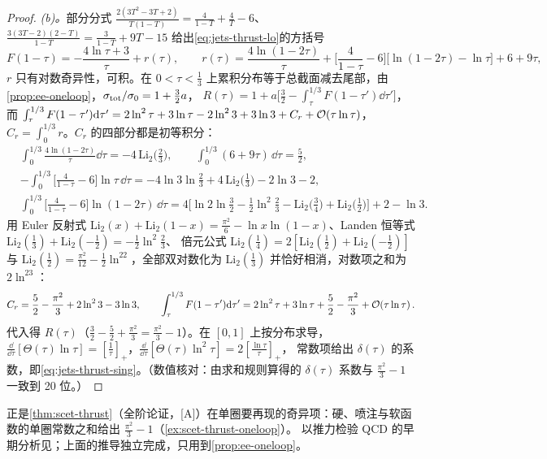 \begin{proof}
\emph{(b)。}部分分式 $\frac{2(3T^2-3T+2)}{T(1-T)}=\frac{4}{1-T}+\frac4T-6$、$\frac{3(3T-2)(2-T)}{1-T}=\frac{3}{1-T}+9T-15$ 给出\cref{eq:jets-thrust-lo}的方括号
\begin{equation}\label{eq:jets-F-split}
F(1-\tau)=-\frac{4\ln\tau+3}{\tau}+r(\tau),\qquad
r(\tau)=\frac{4\ln(1-2\tau)}{\tau}+\Big[\frac{4}{1-\tau}-6\Big]\big[\ln(1-2\tau)-\ln\tau\big]+6+9\tau ,
\end{equation}
$r$ 只有对数奇异性，可积。在 $0<\tau<\frac13$ 上累积分布等于总截面减去尾部，由\cref{prop:ee-oneloop}，$\sigma_{\rm tot}/\sigma_0=1+\frac32a$，
$R(\tau)=1+a\big[\frac32-\int_\tau^{1/3}F(1-\tau')\dd\tau'\big]$，而
$\int_\tau^{1/3}F(1-\tau')\mathrm{d}\tau'=2\ln^2\tau+3\ln\tau-2\ln^23+3\ln3+C_r+\mathcal{O}\!\left(\tau\ln\tau\right)$，$C_r=\int_0^{1/3}r$。$C_r$ 的四部分都是初等积分：
\[
\begin{aligned}
&\int_0^{1/3}\frac{4\ln(1-2\tau)}{\tau}\dd\tau=-4\,\mathrm{Li}_2\big(\tfrac23\big),\qquad \int_0^{1/3}(6+9\tau)\,\dd\tau=\tfrac52,\\
&-\int_0^{1/3}\Big[\frac{4}{1-\tau}-6\Big]\ln\tau\,\dd\tau=-4\ln3\ln\tfrac23+4\,\mathrm{Li}_2\big(\tfrac13\big)-2\ln3-2,\\
&\int_0^{1/3}\Big[\frac{4}{1-\tau}-6\Big]\ln(1-2\tau)\,\dd\tau=4\Big[\ln2\ln\tfrac32-\tfrac12\ln^2\tfrac23-\mathrm{Li}_2\big(\tfrac34\big)+\mathrm{Li}_2\big(\tfrac12\big)\Big]+2-\ln3 .
\end{aligned}
\]
用 Euler 反射式 $\mathrm{Li}_2(x)+\mathrm{Li}_2(1-x)=\frac{\pi^2}{6}-\ln x\ln(1-x)$、Landen 恒等式 $\mathrm{Li}_2(\frac13)+\mathrm{Li}_2(-\frac12)=-\frac12\ln^2\frac23$、
倍元公式 $\mathrm{Li}_2(\frac14)=2[\mathrm{Li}_2(\frac12)+\mathrm{Li}_2(-\frac12)]$ 与 $\mathrm{Li}_2(\frac12)=\frac{\pi^2}{12}-\frac12\ln^22$，全部双对数化为 $\mathrm{Li}_2(\frac13)$ 并恰好相消，对数项之和为 $2\ln^23$：
\begin{equation}\label{eq:jets-Cr}
C_r=\frac52-\frac{\pi^2}{3}+2\ln^23-3\ln3 ,\qquad
\int_\tau^{1/3}F(1-\tau')\mathrm{d}\tau'=2\ln^2\tau+3\ln\tau+\frac52-\frac{\pi^2}{3}+\mathcal{O}\!\left(\tau\ln\tau\right).
\end{equation}
代入得 $R(\tau)$（$\frac32-\frac52+\frac{\pi^2}{3}=\frac{\pi^2}{3}-1$）。在 $[0,1]$ 上按分布求导，$\frac{\dd}{\dd\tau}[\Theta(\tau)\ln\tau]=[\frac1\tau]_+$，$\frac{\dd}{\dd\tau}[\Theta(\tau)\ln^2\tau]=2[\frac{\ln\tau}{\tau}]_+$，
常数项给出 $\delta(\tau)$ 的系数，即\cref{eq:jets-thrust-sing}。（数值核对：由求和规则算得的 $\delta(\tau)$ 系数与 $\frac{\pi^2}{3}-1$ 一致到 20 位。）
\end{proof}

正是\cref{thm:scet-thrust}（全阶论证，[A]）在单圈要再现的奇异项：硬、喷注与软函数的单圈常数之和给出 $\frac{\pi^2}{3}-1$（\cref{ex:scet-thrust-oneloop}）。
以推力检验 QCD 的早期分析见\cite{Farhi1977,DeRujula:1978vmq}；上面的推导独立完成，只用到\cref{prop:ee-oneloop}。
